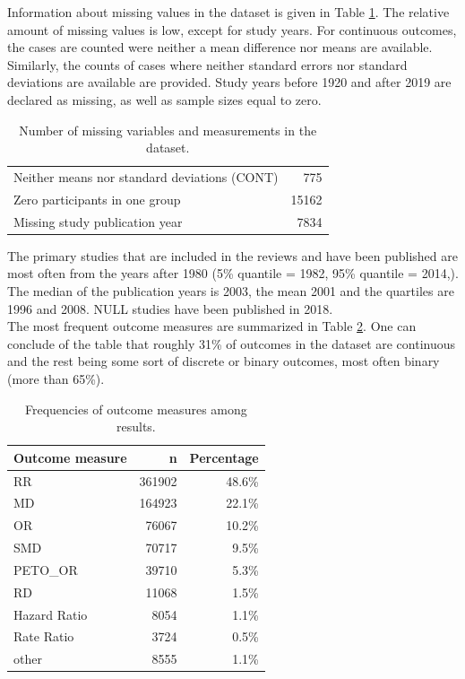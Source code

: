 \documentclass[11pt,a4paper,twoside]{book}\usepackage[]{graphicx}\usepackage[]{color}
\begin{document}
Information about missing values in the dataset is given in Table \ref{missing}. The relative amount of missing values is low, except for study years. For continuous outcomes, the cases are counted were neither a mean difference nor means are available. Similarly, the counts of cases where neither standard errors nor standard deviations are available are provided. Study years before 1920 and after 2019 are declared as missing, as well as sample sizes equal to zero.

\begin{table}[ht]
\centering
\begingroup\footnotesize
\begin{tabular}{lr}
  \hline
  \hline
Neither means nor standard deviations (CONT) & 775 \\ 
  Zero participants in one group & 15162 \\ 
  Missing study publication year & 7834 \\ 
   \hline
\end{tabular}
\endgroup
\caption{Number of missing variables and measurements in the dataset.} 
\label{missing}
\end{table}


The primary studies that are included in the reviews and have been published are most often from the years after 1980 (5\% quantile = 1982, 95\% quantile = 2014,). The median of the publication years is 2003, the mean 2001 and the quartiles are 1996 and 2008. NULL studies have been published in 2018.\\
The most frequent outcome measures are summarized in Table \ref{outcome.measure.frequencies}. One can conclude of the table that roughly 31\% of outcomes in the dataset are continuous and the rest being some sort of discrete or binary outcomes, most often binary (more than 65\%).

\begin{table}[ht]
\centering
\begingroup\footnotesize
\begin{tabular}{lrr}
  \hline
Outcome measure & n & Percentage \\ 
  \hline
RR & 361902 & 48.6\% \\ 
  MD & 164923 & 22.1\% \\ 
  OR & 76067 & 10.2\% \\ 
  SMD & 70717 & 9.5\% \\ 
  PETO\_OR & 39710 & 5.3\% \\ 
  RD & 11068 & 1.5\% \\ 
  Hazard Ratio & 8054 & 1.1\% \\ 
  Rate Ratio & 3724 & 0.5\% \\ 
  other & 8555 & 1.1\% \\ 
   \hline
\end{tabular}
\endgroup
\caption{Frequencies of outcome measures among results.} 
\label{outcome.measure.frequencies}
\end{table}
\end{document}
